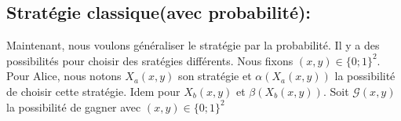 \documentclass{article}
\begin{document}
\subsection{Stratégie classique(avec probabilité):}

Maintenant, nous voulons généraliser le stratégie par la probabilité. Il y a des possibilités pour choisir des sratégies différents. Nous fixons $(x,y) \in \{0;1\}^2$. Pour Alice, nous notons $X_a (x,y)$ son stratégie et $\alpha(X_a (x,y))$ la possibilité de choisir cette stratégie. Idem pour $X_b(x,y)$ et $\beta(X_b (x,y))$. Soit $\mathcal{G} (x,y)$ la possibilité de gagner avec $(x,y) \in \{0;1\}^2$
\end{document}
